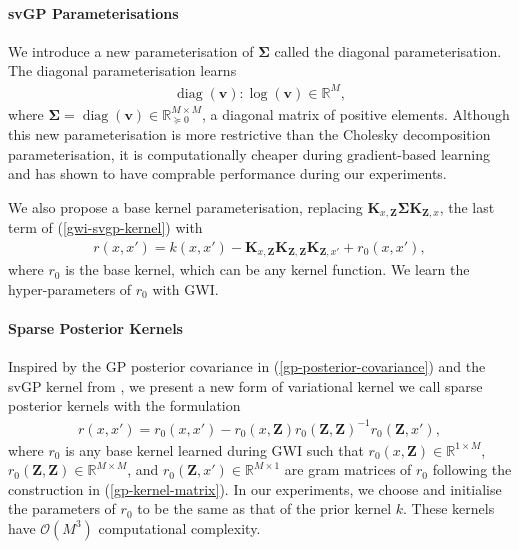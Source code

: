 \documentclass{article}
\newcommand{\diag}{\operatorname{diag}}
\numberwithin{equation}{section}
\begin{document}
\paragraph{svGP Parameterisations}
We introduce a new parameterisation of $\mathbf{\Sigma}$ called the diagonal parameterisation. The diagonal parameterisation learns
\begin{align}
    \diag(\mathbf{v}): \log(\mathbf{v}) \in \mathbb{R}^M,
\end{align}
where $\mathbf{\Sigma} = \diag(\mathbf{v}) \in \mathbb{R}^{M \times M}_{\succcurlyeq 0}$, a diagonal matrix of positive elements. 
Although this new parameterisation is more restrictive than the Cholesky decomposition parameterisation, it is computationally cheaper during gradient-based learning and has shown to have comprable performance during our experiments.

We also propose a base kernel parameterisation, replacing $\mathbf{K}_{x, \mathbf{Z}} \mathbf{\Sigma} \mathbf{K}_{\mathbf{Z}, x}$, the last term of (\ref{gwi-svgp-kernel}) with
\begin{align}
    r(x, x') = k(x, x') - \mathbf{K}_{x, \mathbf{Z}} \mathbf{K}_{\mathbf{Z}, \mathbf{Z}} \mathbf{K}_{\mathbf{Z}, x'} + r_0(x, x'),
\end{align}
where $r_0$ is the base kernel, which can be any kernel function. We learn the hyper-parameters of $r_0$ with GWI.

\paragraph{Sparse Posterior Kernels}
Inspired by the GP posterior covariance in (\ref{gp-posterior-covariance}) and the svGP kernel from \cite{titsias2009variational}, we present a new form of variational kernel we call sparse posterior kernels with the formulation
\begin{align}
    r(x, x') = r_0(x, x') - r_0\left(x, \mathbf{Z}\right) r_0\left(\mathbf{Z}, \mathbf{Z}\right)^{-1} r_0\left(\mathbf{Z}, x'\right),
\end{align}
where $r_0$ is any base kernel learned during GWI such that $r_0\left(x, \mathbf{Z}\right) \in \mathbb{R}^{1 \times M}$, $r_0\left(\mathbf{Z}, \mathbf{Z}\right) \in \mathbb{R}^{M \times M}$, and $r_0\left(\mathbf{Z}, x'\right) \in \mathbb{R}^{M \times 1}$ are gram matrices of $r_0$ following the construction in (\ref{gp-kernel-matrix}).
In our experiments, we choose and initialise the parameters of $r_0$ to be the same as that of the prior kernel $k$.
These kernels have $\mathcal{O}(M^3)$ computational complexity.
\end{document}
